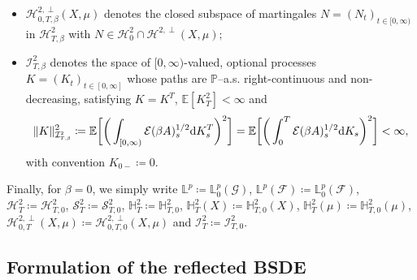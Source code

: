 \documentclass[10pt]{article} %
\newcommand\cE{\mathcal E}
\newcommand\cF{\mathcal F}
\newcommand\cG{\mathcal G}
\newcommand\cH{\mathcal H}
\newcommand\cI{\mathcal I}
\newcommand\cS{\mathcal S}
\newcommand{\smalltext}[1]{\text{\fontsize{4}{4}\selectfont$#1$}}
\def \E{\mathbb{E}}
\def \H{\mathbb{H}}
\def \L{\mathbb{L}}
\def \P{\mathbb{P}}
\newcommand{\1}{\mathbf{1}}
\def\d{\mathrm{d}}
\begin{document}
\begin{itemize}[leftmargin=0.9cm]
		\begin{equation*}
			\|U\|^2_{\H^\smalltext{2}_{\smalltext{T}\smalltext{,}\smalltext{\beta}}(\mu)} \coloneqq \big\|\cE(\beta A)^{1/2}U\mathbf{1}_{\llbracket 0, T \rrbracket}\big\|^2_{\H^\smalltext{2}(\mu)} = \E\bigg[\int_0^T \cE(\beta A)_s \d \langle U \star \tilde\mu \rangle_s\bigg] < \infty;
		\end{equation*}
	\item $\cH^{2,\perp}_{0,T,\beta}(X,\mu)$ denotes the closed subspace of martingales $N = (N_t)_{t \in [0,\infty)}$ in $\cH^2_{T,\beta}$ with $N \in \cH^2_0 \cap \cH^{2,\perp}(X,\mu);$
	\item $\cI^2_{T,\beta}$ denotes the space of $[0,\infty)$-valued, optional processes $K = (K_t)_{t \in [0,\infty]}$ whose paths are $\P$--a.s. right-continuous and non-decreasing, satisfying $K = K^T$, $\E[K^2_T] < \infty$ and
	\begin{equation*}
		\|K\|^2_{\cI^\smalltext{2}_{\smalltext{T}\smalltext{,}\smalltext{\beta}}} \coloneqq \E\bigg[\bigg(\int_{[0,\infty)}\cE(\beta A)^{1/2}_s \d K^T_s\bigg)^2\bigg] = \E\bigg[\bigg(\int_0^T\cE(\beta A)^{1/2}_s \d K_s\bigg)^2\bigg] < \infty,
	\end{equation*}
	with convention $K_{0-} \coloneqq 0$.
	\end{itemize}
Finally, for $\beta = 0$, we simply write $\L^p \coloneqq \L^p_0(\cG)$, $\L^p(\cF) \coloneqq \L^p_0(\cF)$, $\cH^2_T \coloneqq \cH^2_{T,0}$, $\cS^2_T \coloneqq \cS^2_{T,0}$, $\H^2_T \coloneqq \H^2_{T,0}$, $\H^2_T(X) \coloneqq \H^2_{T,0}(X)$, $\H^2_T(\mu) \coloneqq \H^2_{T,0}(\mu)$, $\cH^{2,\perp}_{0,T}(X,\mu) \coloneqq \cH^{2,\perp}_{0,T,0}(X,\mu)$ and $\cI^2_{T} \coloneqq \cI^2_{T,0}$.


\subsection{Formulation of the reflected BSDE}\label{sec::formulation}
\end{document}
